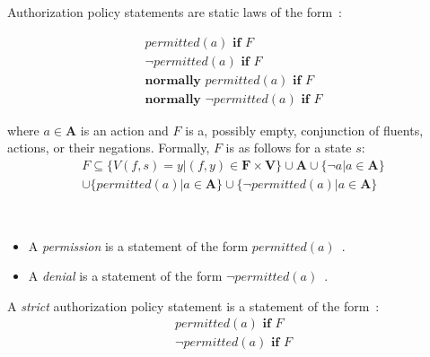 \begin{definition}
    \label{def:authorization_statements}
    Authorization policy statements are static laws of the form~\citep{gelfond_authorization_2008}:

    \begin{gather}
        permitted\left(a\right) \textbf{ if } F \\
        \neg permitted\left(a\right) \textbf{ if } F \\
        \textbf{normally } permitted(a) \textbf{ if } F \\
        \textbf{normally } \neg permitted(a) \textbf{ if } F
    \end{gather}

    \noindent
    where $a \in \boldsymbol{A}$ is an action and $F$ is a, possibly empty, conjunction of fluents, actions, or their negations.
    Formally, $F$ is as follows for a state $s$:\footnotemark
    \begin{multline}
        F\subseteq\{V(f,s)=y | (f, y) \in \boldsymbol{F} \times \boldsymbol{V}\} \cup \boldsymbol{A} \cup \{\neg a | a \in \boldsymbol{A}\} \\ \cup \{permitted(a) | a \in \boldsymbol{A}\} \cup \{\neg permitted(a) | a \in \boldsymbol{A}\}
    \end{multline}

\end{definition}

\begin{definition}
    \label{def:permission}
    \label{def:denial}
    ~

    \begin{itemize}
        \item A \textit{permission} is a statement of the form $permitted(a)$~\citep{gelfond_authorization_2008}.
        \item A \textit{denial} is a statement of the form $\neg permitted(a)$~\citep{gelfond_authorization_2008}.
    \end{itemize}
\end{definition}

\begin{definition}
    \label{def:strict_authorization_statements}
    A \textit{strict} authorization policy statement is a statement of the form~\citep{gelfond_authorization_2008}:
    \begin{gather*}
        permitted\left(a\right) \textbf{ if } F \\
        \neg permitted\left(a\right) \textbf{ if } F
    \end{gather*}
\end{definition}

